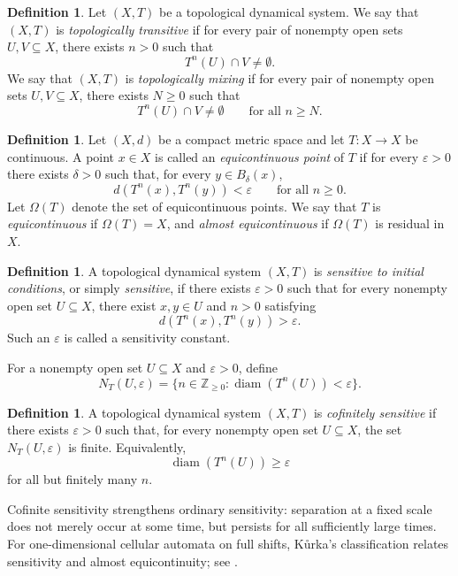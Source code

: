 \documentclass[12pt,a4paper]{article}
\theoremstyle{definition}
\newtheorem{definition}[theorem]{Definition}
\theoremstyle{remark}
\newcommand{\ZZ}{\mathbb{Z}}
\newcommand{\diam}{\operatorname{diam}}
\begin{document}
\begin{definition}
Let $(X,T)$ be a topological dynamical system. We say that $(X,T)$ is \emph{topologically transitive} if for every pair of nonempty open sets $U,V\subseteq X$, there exists $n>0$ such that
\[
T^n(U)\cap V\neq\emptyset.
\]
We say that $(X,T)$ is \emph{topologically mixing} if for every pair of nonempty open sets $U,V\subseteq X$, there exists $N\geq 0$ such that
\[
T^n(U)\cap V\neq\emptyset\qquad\text{for all }n\geq N.
\]
\end{definition}

\begin{definition}
Let $(X,d)$ be a compact metric space and let $T:X\to X$ be continuous. A point $x\in X$ is called an \emph{equicontinuous point} of $T$ if for every $\varepsilon>0$ there exists $\delta>0$ such that, for every $y\in B_\delta(x)$,
\[
d(T^n(x),T^n(y))<\varepsilon\qquad\text{for all }n\geq 0.
\]
Let $\Omega(T)$ denote the set of equicontinuous points. We say that $T$ is \emph{equicontinuous} if $\Omega(T)=X$, and \emph{almost equicontinuous} if $\Omega(T)$ is residual in $X$.
\end{definition}

\begin{definition}
A topological dynamical system $(X,T)$ is \emph{sensitive to initial conditions}, or simply \emph{sensitive}, if there exists $\varepsilon>0$ such that for every nonempty open set $U\subseteq X$, there exist $x,y\in U$ and $n>0$ satisfying
\[
d(T^n(x),T^n(y))>\varepsilon.
\]
Such an $\varepsilon$ is called a sensitivity constant.
\end{definition}

For a nonempty open set $U\subseteq X$ and $\varepsilon>0$, define
\[
N_T(U,\varepsilon)=\{n\in\ZZ_{\geq 0}:\diam(T^n(U))<\varepsilon\}.
\]

\begin{definition}
A topological dynamical system $(X,T)$ is \emph{cofinitely sensitive} if there exists $\varepsilon>0$ such that, for every nonempty open set $U\subseteq X$, the set $N_T(U,\varepsilon)$ is finite. Equivalently,
\[
\diam(T^n(U))\geq \varepsilon
\]
for all but finitely many $n$.
\end{definition}

Cofinite sensitivity strengthens ordinary sensitivity: separation at a fixed scale does not merely occur at some time, but persists for all sufficiently large times. For one-dimensional cellular automata on full shifts, K\r{u}rka's classification relates sensitivity and almost equicontinuity; see \cite{kuurka2003topological}.
\end{document}

